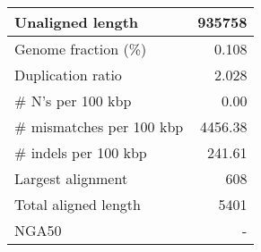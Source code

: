 \documentclass[12pt,a4paper]{article}
\begin{document}
\begin{table}[ht]
\begin{center}
\begin{tabular}{|l*{1}{|r}|}
Unaligned length & 935758 \\ \hline
Genome fraction (\%) & 0.108 \\ \hline
Duplication ratio & 2.028 \\ \hline
\# N's per 100 kbp & 0.00 \\ \hline
\# mismatches per 100 kbp & 4456.38 \\ \hline
\# indels per 100 kbp & 241.61 \\ \hline
Largest alignment & 608 \\ \hline
Total aligned length & 5401 \\ \hline
NGA50 & - \\ \hline
\end{tabular}
\end{center}
\end{table}
\end{document}
